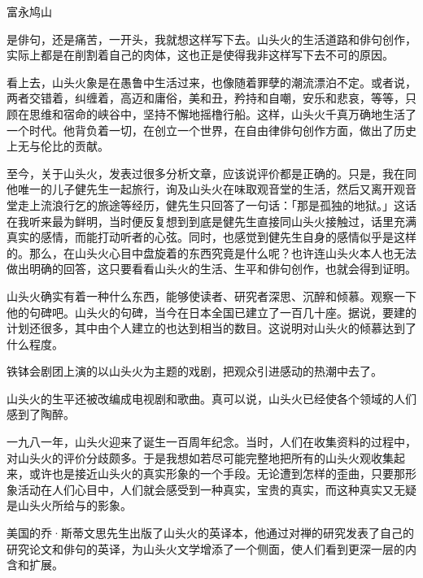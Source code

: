  {\FS

  \hfill 富永鸠山\footnotemark[1]


  \bigskip

  是俳句，还是痛苦\footnotemark[2]，一开头，我就想这样写下去。山头火的生活道路和俳句创作，实际上都是在削割着自己的肉体，这也正是使得我非这样写下去不可的原因。


  看上去，山头火象是在愚鲁中生活过来，也像随着罪孽的潮流漂泊不定。或者说，两者交错着，纠缠着，高迈和庸俗，美和丑，矜持和自嘲，安乐和悲哀，等等，只顾在思维和宿命的峡谷中，坚持不懈地摇橹行船。这样，山头火千真万确地生活了一个时代。他背负着一切，在创立一个世界，在自由律俳句创作方面，做出了历史上无与伦比的贡献。

  至今，关于山头火，发表过很多分析文章，应该说评价都是正确的。只是，我在同他唯一的儿子健先生一起旅行，询及山头火在味取观音堂的生活，然后又离开观音堂走上流浪行乞的旅途等经历，健先生只回答了一句话：「那是孤独的地狱。」这话在我听来最为鲜明，当时便反复想到到底是健先生直接同山头火接触过，话里充满真实的感情，而能打动听者的心弦。同时，也感觉到健先生自身的感情似乎是这样的。那么，在山头火心目中盘旋着的东西究竟是什么呢？也许连山头火本人也无法做出明确的回答，这只要看看山头火的生活、生平和俳句创作，也就会得到证明。

  山头火确实有着一种什么东西，能够使读者、研究者深思、沉醉和倾慕。观察一下他的句碑吧。山头火的句碑，当今在日本全国已建立了一百几十座。据说，要建的计划还很多，其中由个人建立的也达到相当的数目。这说明对山头火的倾慕达到了什么程度。

  铁钵会剧团上演的以山头火为主题的戏剧，把观众引进感动的热潮中去了。

  山头火的生平还被改编成电视剧和歌曲。真可以说，山头火已经使各个领域的人们感到了陶醉。

  一九八一年，山头火迎来了诞生一百周年纪念。当时，人们在收集资料的过程中，对山头火的评价分歧颇多。于是我想如若尽可能完整地把所有的山头火观收集起来，或许也是接近山头火的真实形象的一个手段。无论遭到怎样的歪曲，只要那形象活动在人们心目中，人们就会感受到一种真实，宝贵的真实，而这种真实又无疑是山头火所给与的影象。

  美国的乔·斯蒂文思先生出版了山头火的英译本，他通过对禅的研究发表了自己的研究论文和俳句的英译，为山头火文学增添了一个侧面，使人们看到更深一层的内含和扩展。

}
